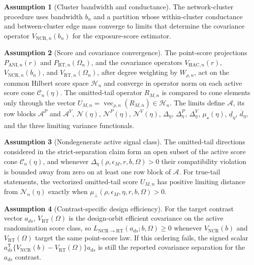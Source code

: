 \documentclass[11pt]{article}
\newcommand{\transpose}{\mathsf{T}}
\theoremstyle{definition}
\newtheorem{assumption}{Assumption}
\theoremstyle{plain}
\theoremstyle{remark}
\begin{document}
\begin{assumption}[Cluster bandwidth and conductance]\label{ass:cluster-bandwidth}
The network-cluster procedure uses bandwidth \(b_n\) and a partition whose
within-cluster conductance and between-cluster edge mass converge to limits
that determine the covariance operator \(V_{\mathrm{NCR},n}(b_n)\) for the
exposure-score estimator.
\end{assumption}

\begin{assumption}[Score and covariance convergence]\label{ass:kernel-convergence}
The point-score projections \(P_{\mathrm{ANI},n}(r)\) and
\(P_{\mathrm{RT},n}(\Omega_n)\), and the covariance operators
\(V_{\mathrm{HAC},n}(r)\), \(V_{\mathrm{NCR},n}(b_n)\), and
\(V_{\mathrm{RT},n}(\Omega_n)\), after degree weighting by \(W_{\rho,n}\),
act on the common Hilbert score space \(\mathcal H_n\) and converge in
operator norm on each active score cone \(\mathcal C_n(\eta)\).  The
omitted-tail operator \(R_{M,n}\) is compared to cone elements only through the
vector \(U_{M,n}=\operatorname{vec}_{\rho,n}(R_{M,n})\in\mathcal H_n\).  The
limits define \(\mathcal A\), its row blocks \(\mathcal A^P\) and
\(\mathcal A^V\), \(\mathcal N(\eta)\), \(\mathcal N^P(\eta)\),
\(\mathcal N^V(\eta)\), \(\Delta_\eta\), \(\Delta^P_\eta\),
\(\Delta^V_\eta\), \(\mu_\star(\eta)\), \(\underline d_\eta\),
\(\overline d_\eta\), and the three limiting variance functionals.
\end{assumption}

\begin{assumption}[Nondegenerate active signal class]\label{ass:nondegenerate-signal}
The omitted-tail directions considered in the strict-separation claim form an
open subset of the active score cone \(\mathcal C_n(\eta)\), and whenever
\(\Delta_\eta(\rho,\epsilon_M,r,b,\Omega)>0\) their compatibility violation is
bounded away from zero on at least one row block of \(\mathcal A\).  For
true-tail statements, the vectorized omitted-tail score \(U_{M,n}\) has
positive limiting distance from \(\mathcal N_n(\eta)\) exactly when
\(\mu_{\perp}(\rho,\epsilon_M,\eta,r,b,\Omega)>0\).
\end{assumption}

\begin{assumption}[Contrast-specific design efficiency]\label{ass:contrast-efficiency}
For the target contrast vector \(a_{ds}\), \(V_{\mathrm{RT}}(\Omega)\) is the
design-orbit efficient covariance on the active randomization score class, so
\(L_{\mathrm{NCR}\to\mathrm{RT}}(a_{ds};b,\Omega)\ge0\) whenever
\(V_{\mathrm{NCR}}(b)\) and \(V_{\mathrm{RT}}(\Omega)\) target the same
point-score law.  If this ordering fails, the signed scalar
\(a_{ds}^{\transpose}\{V_{\mathrm{NCR}}(b)-V_{\mathrm{RT}}(\Omega)\}a_{ds}\)
is still the reported covariance separation for the \(a_{ds}\) contrast.
\end{assumption}
\end{document}
